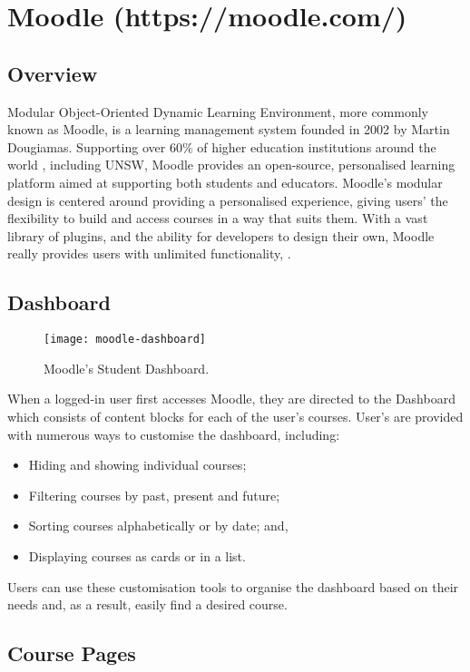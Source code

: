 \section{Moodle (https://moodle.com/)}
\subsection{Overview}
Modular Object-Oriented Dynamic Learning Environment, more commonly known as Moodle, is a learning management system founded in 2002 by Martin Dougiamas.
Supporting over 60\% of higher education institutions around the world \cite{moodleLMS}, including UNSW, Moodle provides an open-source, personalised learning platform aimed at supporting both students and educators.
Moodle's modular design is centered around providing a personalised experience, giving users' the flexibility to build and access courses in a way that suits them.
With a vast library of plugins, and the ability for developers to design their own, Moodle really provides users with unlimited functionality, \cite{moodleIntro}.

\subsection{Dashboard}

\begin{figure}[h!]
    \centering
    \texttt{[image: moodle-dashboard]}
    \caption{Moodle's Student Dashboard.}
\end{figure}

When a logged-in user first accesses Moodle, they are directed to the Dashboard which consists of content blocks for each of the user's courses.
User's are provided with numerous ways to customise the dashboard, including:

\begin{itemize}
    \item Hiding and showing individual courses;
    \item Filtering courses by past, present and future;
    \item Sorting courses alphabetically or by date; and,
    \item Displaying courses as cards or in a list.
\end{itemize}

Users can use these customisation tools to organise the dashboard based on their needs and, as a result, easily find a desired course.

\subsection{Course Pages}

